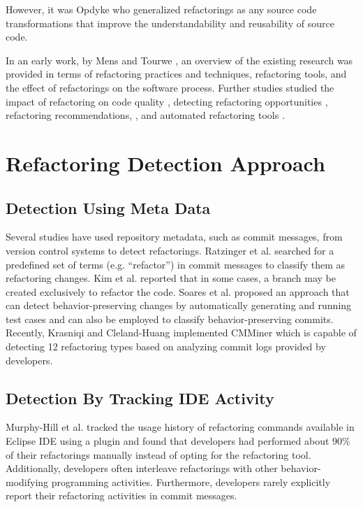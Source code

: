 \documentclass[letterpaper,12pt,onecolumn,final]{report}
\begin{document}
However, it was Opdyke \cite{OPDYKE1990} who generalized refactorings as any source code transformations that improve the understandability and reusability of source code.

In an early work, by Mens and Tourwe \cite{Mens2004}, an overview of the existing research was provided in terms of refactoring practices and techniques, refactoring tools, and the effect of refactorings on the software process. Further studies studied the impact of refactoring on code quality \cite{Moser2006} \cite{wilking2007empirical} \cite{bavota2015experimental} \cite{cedrim2016does} \cite{pantiuchina2018improving} \cite{alomar2019impact},  detecting refactoring opportunities \cite{fontana2012automatic} \cite{palomba2013detecting}, refactoring recommendations, \cite{mkaouer2015many} \cite{bavota2014recommending} \cite{ouni2016multi}, and automated refactoring tools \cite{roberts1997refactoring} \cite{mazinanian2016jdeodorant} \cite{Kim2010} \cite{Tsantalis2018} \cite{Silva2020} \cite{Moghadam2021}.

\section{Refactoring Detection Approach}
\subsection{Detection Using Meta Data}
Several studies have used repository metadata, such as commit messages, from version control systems to detect refactorings. 
Ratzinger et al. \cite{ratzinger2008relation} searched for a predefined set of terms (e.g. “refactor”) in commit messages to classify them as refactoring changes. Kim et al. \cite{kim2014empirical} reported that in some cases, a branch may be created exclusively to refactor the code. Soares et al. \cite{soares2010making} proposed an approach that can detect behavior-preserving changes by automatically generating and running test cases and can also be employed to classify behavior-preserving commits. Recently, Krasniqi and Cleland-Huang \cite{Krasniqi2020} implemented CMMiner which is capable of detecting 12 refactoring types based on analyzing commit logs provided by developers.

\subsection{Detection By Tracking IDE Activity}
Murphy-Hill et al. \cite{MurphyHill2012} tracked the usage history of refactoring commands available in Eclipse IDE using a plugin and found that developers had performed about 90\% of their refactorings manually instead of opting for the refactoring tool. Additionally, developers often interleave refactorings with other behavior-modifying programming activities. Furthermore, developers rarely explicitly report their refactoring activities in commit messages.
\end{document}
